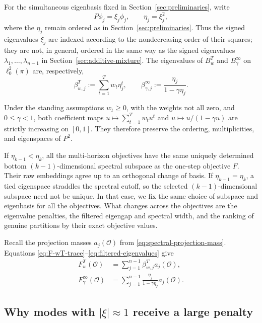\documentclass[11pt]{article}
\newcommand{\1}{\mathbf{1}}
\begin{document}
For the simultaneous eigenbasis fixed in
Section~\ref{sec:preliminaries}, write
\[
P\phi_j=\xi_j\phi_j,
\qquad
\eta_j=\xi_j^2,
\]
where the $\eta_j$ remain ordered as in Section~\ref{sec:preliminaries}.
Thus
the signed eigenvalues $\xi_j$ are indexed according to the
nondecreasing order of their squares; they are not, in general,
ordered in the same way as the signed eigenvalues
$\lambda_1,\ldots,\lambda_{n-1}$ in
Section~\ref{sec:additive-mixture}.
The eigenvalues of $B_w^T$ and $B_\gamma^\infty$ on
$\ell^2_0(\pi)$ are, respectively,
\begin{equation}
	\beta_{w,j}^T
	:=\sum_{t=1}^T w_t\eta_j^t,
	\qquad
	\beta_{\gamma,j}^\infty
	:=\frac{\eta_j}{1-\gamma\eta_j}.
	\label{eq:filtered-eigenvalues}
\end{equation}

Under the standing assumptions $w_t\geq0$, with the weights not all
zero, and $0\leq\gamma<1$, both coefficient maps
$u\mapsto\sum_{t=1}^T w_tu^t$ and
$u\mapsto u/(1-\gamma u)$ are strictly increasing on $[0,1]$.
They therefore preserve the ordering, multiplicities, and eigenspaces
of $P^2$.

If $\eta_{k-1}<\eta_k$, all the multi-horizon objectives have the
same uniquely determined bottom $(k-1)$-dimensional spectral
subspace as the one-step objective $F$.  Their raw embeddings agree
up to an orthogonal change of basis.  If
$\eta_{k-1}=\eta_k$, a tied eigenspace straddles the spectral cutoff,
so the selected $(k-1)$-dimensional subspace need not be unique.  In
that case, we fix the same choice of subspace and eigenbasis for all
the objectives.  What changes across the objectives are the
eigenvalue penalties, the filtered eigengap and spectral width, and
the ranking of genuine partitions by their exact objective values.

Recall the projection masses $a_j(\mathcal O)$ from
\eqref{eq:spectral-projection-mass}.
Equations \eqref{eq:F-wT-trace}--\eqref{eq:filtered-eigenvalues}
give
\begin{align}
    F_w^T(\mathcal O)
    &=\sum_{j=1}^{n-1}
      \beta_{w,j}^T a_j(\mathcal O),
    \label{eq:F-w-mode-expansion}\\
    F_\gamma^\infty(\mathcal O)
    &=\sum_{j=1}^{n-1}
      \frac{\eta_j}{1-\gamma\eta_j}
      a_j(\mathcal O).
    \label{eq:F-gamma-mode-expansion}
\end{align}

\subsection{Why modes with \texorpdfstring{$|\xi|\approx1$}
{|xi| approximately 1} receive a large penalty}
\end{document}
